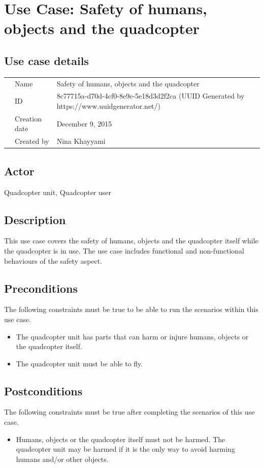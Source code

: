 \documentclass[a4paper]{article}
\begin{document}
\section{Use Case: Safety of humans, objects and the quadcopter}
\subsection{Use case details}

\begin{tabular}{lll}
	&Name  & Safety of humans, objects and the quadcopter\\
	&ID  & 8c77715a-d70d-4cf0-8e9c-5e18d3d2f2ca (UUID Generated by https://www.uuidgenerator.net/)  \\
	&Creation date  & December 9, 2015\\
	&Created by  & Nina Khayyami
\end{tabular}

\subsection{Actor}
Quadcopter unit, Quadcopter user
\subsection{Description}
This use case covers the safety of humans, objects and the quadcopter itself while the quadcopter is in use. The use case includes functional and non-functional behaviours of the safety aspect. 
\subsection{Preconditions}
The following constraints must be true to be able to run the scenarios within this use case.
\begin{itemize}
\item The quadcopter unit has parts that can harm or injure humans, objects or the quadcopter itself.
\item The quadcopter unit must be able to fly.
\end{itemize}
\subsection{Postconditions}
The following constraints must be true after completing the scenarios of this use case.
\begin{itemize}
\item Humans, objects or the quadcopter itself must not be harmed. The quadcopter unit may be harmed if it is the only way to avoid harming humans and/or other objects.
\end{itemize}
\end{document}
